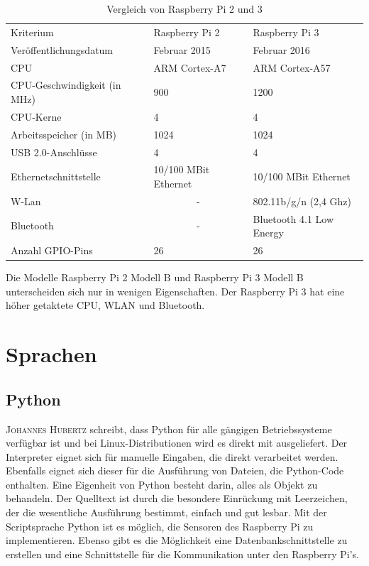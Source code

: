 \begin{table}[h]
\centering
\caption{Vergleich von Raspberry Pi 2 und 3 \cite{CortexA7} \cite{CortexA57}}
\label{tab:VergleichRaspberry}
\begin{tabular}{lll}
Kriterium                    & Raspberry Pi 2        					& Raspberry Pi 3           \\
Veröffentlichungsdatum       & Februar 2015          					& Februar 2016             \\
CPU                          & ARM Cortex-A7   & ARM Cortex-A57           \\
CPU-Geschwindigkeit (in MHz) & 900             & 1200                     \\
CPU-Kerne                    & 4                              & 4                        \\
Arbeitsspeicher (in MB)      & 1024                  					& 1024                     \\
USB 2.0-Anschlüsse           & 4                     					& 4                        \\
Ethernetschnittstelle        & 10/100 MBit Ethernet  					& 10/100 MBit Ethernet     \\
W-Lan                        & \multicolumn{1}{c}{-} 					& 802.11b/g/n (2,4 Ghz)    \\
Bluetooth                    & \multicolumn{1}{c}{-} 					& Bluetooth 4.1 Low Energy \\
Anzahl GPIO-Pins             & 26                    					& 26                      
\end{tabular}
\end{table}
 
Die Modelle Raspberry Pi 2 Modell B und Raspberry Pi 3 Modell B unterscheiden sich nur in wenigen Eigenschaften. Der Raspberry Pi 3 hat eine höher getaktete CPU, WLAN und Bluetooth.

\section{Sprachen}

\subsection{Python}\label{Python}
\textsc{Johannes Hubertz}\cite{hubertz2016softwaretests} schreibt, dass Python für alle gängigen Betriebssysteme verfügbar ist und bei Linux-Distributionen wird es direkt mit ausgeliefert. Der Interpreter eignet sich für manuelle Eingaben, die direkt verarbeitet werden. Ebenfalls eignet sich dieser für die Ausführung von Dateien, die Python-Code enthalten. Eine Eigenheit von Python besteht darin, alles als Objekt zu behandeln. Der Quelltext ist durch die besondere Einrückung mit Leerzeichen, der die wesentliche Ausführung bestimmt, einfach und gut lesbar.  Mit der Scriptsprache Python ist es möglich, die Sensoren des Raspberry Pi zu implementieren. Ebenso gibt es die Möglichkeit eine Datenbankschnittstelle zu erstellen und eine Schnittstelle für die Kommunikation unter den Raspberry Pi's.

